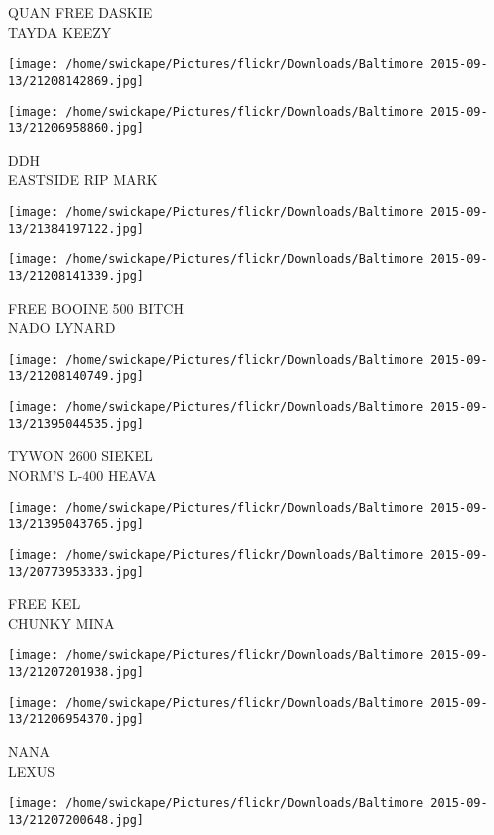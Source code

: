 \documentclass[10pt,letterpaper]{article}
\begin{document}
QUAN FREE DASKIE\\
TAYDA KEEZY
\pagebreak

\texttt{[image: /home/swickape/Pictures/flickr/Downloads/Baltimore 2015-09-13/21208142869.jpg]}

\vspace{0.25in}
\texttt{[image: /home/swickape/Pictures/flickr/Downloads/Baltimore 2015-09-13/21206958860.jpg]}

DDH\\
EASTSIDE RIP MARK
\pagebreak

\texttt{[image: /home/swickape/Pictures/flickr/Downloads/Baltimore 2015-09-13/21384197122.jpg]}

\vspace{0.25in}
\texttt{[image: /home/swickape/Pictures/flickr/Downloads/Baltimore 2015-09-13/21208141339.jpg]}

FREE BOOINE 500 BITCH\\
NADO LYNARD
\pagebreak

\texttt{[image: /home/swickape/Pictures/flickr/Downloads/Baltimore 2015-09-13/21208140749.jpg]}

\vspace{0.25in}
\texttt{[image: /home/swickape/Pictures/flickr/Downloads/Baltimore 2015-09-13/21395044535.jpg]}

TYWON 2600 SIEKEL\\
NORM'S L{-}400 HEAVA
\pagebreak

\texttt{[image: /home/swickape/Pictures/flickr/Downloads/Baltimore 2015-09-13/21395043765.jpg]}

\vspace{0.25in}
\texttt{[image: /home/swickape/Pictures/flickr/Downloads/Baltimore 2015-09-13/20773953333.jpg]}

FREE KEL\\
CHUNKY MINA
\pagebreak

\texttt{[image: /home/swickape/Pictures/flickr/Downloads/Baltimore 2015-09-13/21207201938.jpg]}

\vspace{0.25in}
\texttt{[image: /home/swickape/Pictures/flickr/Downloads/Baltimore 2015-09-13/21206954370.jpg]}

NANA\\
LEXUS
\pagebreak

\texttt{[image: /home/swickape/Pictures/flickr/Downloads/Baltimore 2015-09-13/21207200648.jpg]}
\end{document}
